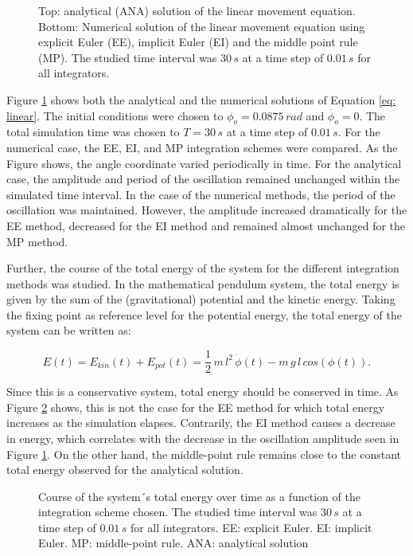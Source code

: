 \documentclass[12pt,bibstyle=none,pagenumberinfooter]{ifmdocument}
\begin{document}
\begin{figure}[h]
    \centering
    
    \caption{Top: analytical (ANA) solution of the linear movement equation. Bottom: Numerical solution of the linear movement equation using explicit Euler (EE), implicit Euler (EI) and the middle point rule (MP). The studied time interval was $30\,s$ at a time step of $0.01\,s$ for all integrators.}
    \label{fig:LinSolutions}
\end{figure}

Figure \ref{fig:LinSolutions} shows both the analytical and the numerical solutions of Equation \ref{eq: linear}. The initial conditions were chosen to $\phi_o = 0.0875\,rad$ and $\Dot{\phi_o}= 0$. The total simulation time was chosen to $T = 30\,s$ at a time step of $0.01\,s$. For the numerical case, the EE, EI, and MP integration schemes were compared. As the Figure shows, the angle coordinate varied periodically in time. For the analytical case, the amplitude and period of the oscillation remained unchanged within the simulated time interval. In the case of the numerical methods, the period of the oscillation was maintained. However, the amplitude increased dramatically for the EE method, decreased for the EI method and remained almost unchanged for the MP method. 

Further, the course of the total energy of the system for the different integration methods was studied. In the mathematical pendulum system, the total energy is given by the sum of the (gravitational) potential and the kinetic energy. Taking the fixing point as reference level for the potential energy, the total energy of the system can be written as:

\begin{equation}
    E(t) = E_{kin}(t) + E_{pot}(t) = \frac{1}{2}\,m\,l^2\,\Dot{\phi}(t) - m\,g\,l\,cos\left(\phi(t)\right).
    \label{eq: energy}
\end{equation}

Since this is a conservative system, total energy should be conserved in time. As Figure \ref{fig: EnergyPlot} shows, this is not the case for the EE method for which total energy increases as the simulation elapses. Contrarily, the EI method causes a decrease in energy, which correlates with the decrease in the oscillation amplitude seen in Figure \ref{fig:LinSolutions}. On the other hand, the middle-point rule remains close to the constant total energy observed for the analytical solution.

\begin{figure}[h]
    \centering
    
    \caption{Course of the system´s total energy over time as a function of the integration scheme chosen. The studied time interval was $30\,s$ at a time step of $0.01\,s$ for all integrators. EE: explicit Euler. EI: implicit Euler. MP: middle-point rule. ANA: analytical solution}
    \label{fig: EnergyPlot}
\end{figure}
\end{document}
